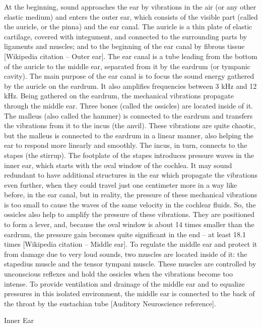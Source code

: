 At the beginning, sound approaches the ear by vibrations in the air (or any other elastic medium) and enters the outer ear, which consists of the visible part (called the auricle, or the pinna) and the ear canal. The auricle is a thin plate of elastic cartilage, covered with integument, and connected to the surrounding parts by ligaments and muscles; and to the beginning of the ear canal by fibrous tissue [Wikipedia citation – Outer ear]. The ear canal is a tube leading from the bottom of the auricle to the middle ear, separated from it by the eardrum (or tympanic cavity). The main purpose of the ear canal is to focus the sound energy gathered by the auricle on the eardrum. It also amplifies frequencies between 3 kHz and 12 kHz.
Being gathered on the eardrum, the mechanical vibrations propagate through the middle ear. Three bones (called the ossicles) are located inside of it. The malleus (also called the hammer) is connected to the eardrum and transfers the vibrations from it to the incus (the anvil). These vibrations are quite chaotic, but the malleus is connected to the eardrum in a linear manner, also helping the ear to respond more linearly and smoothly. The incus, in turn, connects to the stapes (the stirrup). The footplate of the stapes introduces pressure waves in the inner ear, which starts with the oval window of the cochlea. It may sound redundant to have additional structures in the ear which propagate the vibrations even further, when they could travel just one centimeter more in a way like before, in the ear canal, but in reality, the pressure of these mechanical vibrations is too small to cause the waves of the same velocity in the cochlear fluids. So, the ossicles also help to amplify the pressure of these vibrations. They are positioned to form a lever, and, because the oval window is about 14 times smaller than the eardrum, the pressure gain becomes quite significant in the end -- at least 18.1 times [Wikipedia citation – Middle ear].
To regulate the middle ear and protect it from damage due to very loud sounds, two muscles are located inside of it: the stapedius muscle and the tensor tympani muscle. These muscles are controlled by unconscious reflexes and hold the ossicles when the vibrations become too intense.
To provide ventilation and drainage of the middle ear and to equalize pressures in this isolated environment, the middle ear is connected to the back of the throat by the eustachian tube [Auditory Neuroscience reference].


Inner Ear


